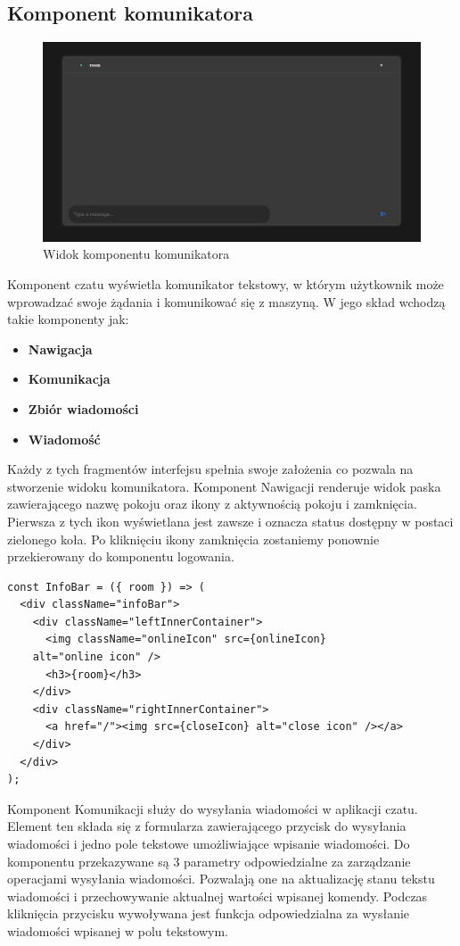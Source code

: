 \subsection{Komponent komunikatora}
\begin{figure}[htbp]
	\centering
	\includegraphics[width=0.7\linewidth]{"obrazy/komunikator"}
	\caption{Widok komponentu komunikatora}
	\label{fig:9}
\end{figure} 
\newpage
Komponent czatu wyświetla komunikator tekstowy, w którym użytkownik może wprowadzać swoje żądania i komunikować się z maszyną. W jego skład wchodzą takie komponenty jak: 
\begin{itemize}  
\item \textbf{ Nawigacja}
	\\
\item \textbf{ Komunikacja}
	\\
\item \textbf{ Zbiór wiadomości}
	\\
\item \textbf{ Wiadomość}
	\\
\end{itemize}
Każdy z tych fragmentów interfejsu spełnia swoje założenia co pozwala na stworzenie widoku komunikatora. Komponent Nawigacji renderuje widok paska zawierającego nazwę pokoju oraz ikony z aktywnością pokoju i zamknięcia. Pierwsza z tych ikon wyświetlana jest zawsze i oznacza status dostępny w postaci zielonego koła. Po kliknięciu ikony zamknięcia zostaniemy ponownie przekierowany do komponentu logowania.
\begin{lstlisting}[caption=Implementacja komponentu nawigacji ]
const InfoBar = ({ room }) => (
  <div className="infoBar">
    <div className="leftInnerContainer">
      <img className="onlineIcon" src={onlineIcon} 
	alt="online icon" />
      <h3>{room}</h3>
    </div>
    <div className="rightInnerContainer">
      <a href="/"><img src={closeIcon} alt="close icon" /></a>
    </div>
  </div>
);
\end{lstlisting}
Komponent Komunikacji służy do wysyłania wiadomości w aplikacji czatu. Element ten składa się z formularza zawierającego przycisk do wysyłania wiadomości i jedno pole tekstowe umożliwiające wpisanie wiadomości. Do komponentu przekazywane są 3 parametry odpowiedzialne za zarządzanie operacjami wysyłania wiadomości. Pozwalają one na aktualizację stanu tekstu wiadomości i przechowywanie aktualnej wartości wpisanej komendy. Podczas kliknięcia przycisku wywoływana jest funkcja odpowiedzialna za wysłanie wiadomości wpisanej w polu tekstowym.
